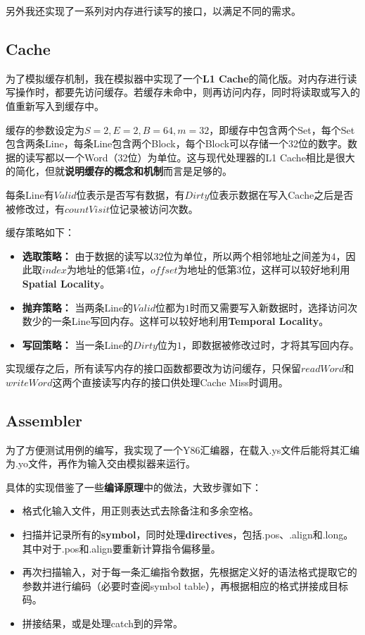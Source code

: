 另外我还实现了一系列对内存进行读写的接口，以满足不同的需求。

\subsection{Cache}

为了模拟缓存机制，我在模拟器中实现了一个{\bf L1 Cache}的简化版。对内存进行读写操作时，都要先访问缓存。若缓存未命中，则再访问内存，同时将读取或写入的值重新写入到缓存中。

缓存的参数设定为$S = 2, E = 2, B = 64, m = 32$，即缓存中包含两个Set，每个Set包含两条Line，每条Line包含两个Block，每个Block可以存储一个$32$位的数字。数据的读写都以一个Word（$32$位）为单位。这与现代处理器的L1 Cache相比是很大的简化，但就{\bf 说明缓存的概念和机制}而言是足够的。

每条Line有$Valid$位表示是否写有数据，有$Dirty$位表示数据在写入Cache之后是否被修改过，有$countVisit$位记录被访问次数。

缓存策略如下：

\begin{itemize}
\item {\bf 选取策略：} 由于数据的读写以$32$位为单位，所以两个相邻地址之间差为$4$，因此取$index$为地址的低第$4$位，$offset$为地址的低第$3$位，这样可以较好地利用{\bf Spatial Locality}。
\item {\bf 抛弃策略：} 当两条Line的$Valid$位都为$1$时而又需要写入新数据时，选择访问次数少的一条Line写回内存。这样可以较好地利用{\bf Temporal Locality}。
\item {\bf 写回策略：} 当一条Line的$Dirty$位为$1$，即数据被修改过时，才将其写回内存。
\end{itemize}

实现缓存之后，所有读写内存的接口函数都要改为访问缓存，只保留$readWord$和$writeWord$这两个直接读写内存的接口供处理Cache Miss时调用。

\subsection{Assembler}

为了方便测试用例的编写，我实现了一个Y86汇编器，在载入.ys文件后能将其汇编为.yo文件，再作为输入交由模拟器来运行。

具体的实现借鉴了一些{\bf 编译原理}中的做法，大致步骤如下：

\begin{itemize}
\item 格式化输入文件，用正则表达式去除备注和多余空格。
\item 扫描并记录所有的{\bf symbol}，同时处理{\bf directives}，包括.pos、.align和.long。其中对于.pos和.align要重新计算指令偏移量。
\item 再次扫描输入，对于每一条汇编指令数据，先根据定义好的语法格式提取它的参数并进行编码（必要时查阅symbol table），再根据相应的格式拼接成目标码。
\item 拼接结果，或是处理catch到的异常。
\end{itemize}

